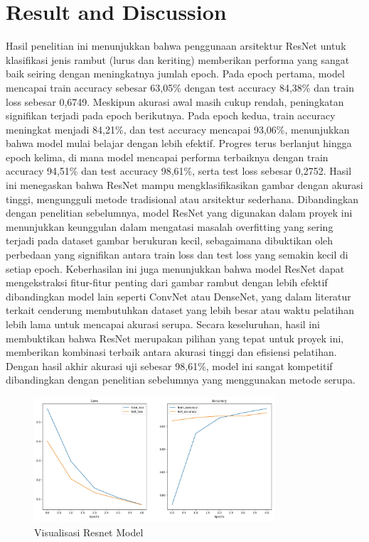 \documentclass[12pt,a4paper]{article}
\begin{document}
\section{Result and Discussion}
Hasil penelitian ini menunjukkan bahwa penggunaan arsitektur ResNet untuk klasifikasi jenis rambut (lurus dan keriting) memberikan performa yang sangat baik seiring dengan meningkatnya jumlah epoch. Pada epoch pertama, model mencapai train accuracy sebesar 63,05\% dengan test accuracy 84,38\% dan train loss sebesar 0,6749. Meskipun akurasi awal masih cukup rendah, peningkatan signifikan terjadi pada epoch berikutnya. Pada epoch kedua, train accuracy meningkat menjadi 84,21\%, dan test accuracy mencapai 93,06\%, menunjukkan bahwa model mulai belajar dengan lebih efektif. Progres terus berlanjut hingga epoch kelima, di mana model mencapai performa terbaiknya dengan train accuracy 94,51\% dan test accuracy 98,61\%, serta test loss sebesar 0,2752. Hasil ini menegaskan bahwa ResNet mampu mengklasifikasikan gambar dengan akurasi tinggi, mengungguli metode tradisional atau arsitektur sederhana. Dibandingkan dengan penelitian sebelumnya, model ResNet yang digunakan dalam proyek ini menunjukkan keunggulan dalam mengatasi masalah overfitting yang sering terjadi pada dataset gambar berukuran kecil, sebagaimana dibuktikan oleh perbedaan yang signifikan antara train loss dan test loss yang semakin kecil di setiap epoch. Keberhasilan ini juga menunjukkan bahwa model ResNet dapat mengekstraksi fitur-fitur penting dari gambar rambut dengan lebih efektif dibandingkan model lain seperti ConvNet atau DenseNet, yang dalam literatur terkait cenderung membutuhkan dataset yang lebih besar atau waktu pelatihan lebih lama untuk mencapai akurasi serupa. Secara keseluruhan, hasil ini membuktikan bahwa ResNet merupakan pilihan yang tepat untuk proyek ini, memberikan kombinasi terbaik antara akurasi tinggi dan efisiensi pelatihan. Dengan hasil akhir akurasi uji sebesar 98,61\%, model ini sangat kompetitif dibandingkan dengan penelitian sebelumnya yang menggunakan metode serupa.

\begin{figure}[h!]
    \centering
    \includegraphics[width=0.8\textwidth]{images/resnetfix.jpeg} %
    \caption{Visualisasi Resnet Model}
    \label{fig:result}
\end{figure}
\end{document}
